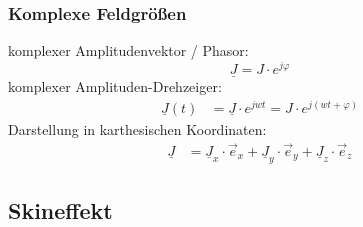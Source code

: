 \subsubsection{Komplexe Feldgrößen}
\textbullet komplexer Amplitudenvektor / Phasor:
\begin{equation*}
	\underline{J}=J\cdot e^{j\varphi}
\end{equation*}
\textbullet komplexer Amplituden-Drehzeiger:
\begin{align*}
\underline{J}(t)&=\underline{J} \cdot e ^{jwt} = J \cdot e^{j(wt+\varphi)}
\end{align*}
\textbullet Darstellung in karthesischen Koordinaten:
\begin{align*}
	\underline{J}&=\underline{J}_x \cdot \vec{e}_x + \underline{J}_y \cdot \vec{e}_y + \underline{J}_z \cdot \vec{e}_z
\end{align*}

\subsection{Skineffekt}\label{sec:skineffekt}



